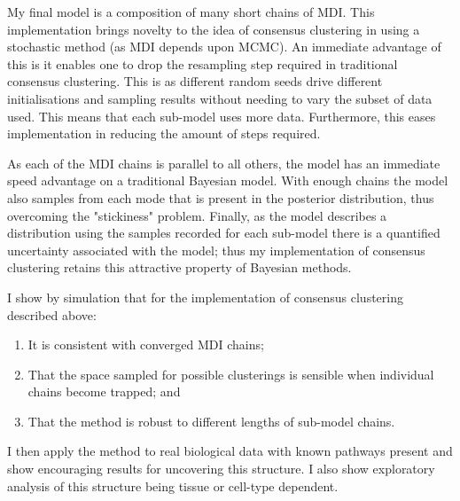 \documentclass[12pt]{article} %
\begin{document}
	My final model is a composition of many short chains of MDI.
	This implementation brings novelty to the idea of consensus clustering in using a stochastic method (as MDI depends upon MCMC). An immediate advantage of this is it enables one to drop the resampling step required in traditional consensus clustering. This is as different random seeds drive different initialisations and sampling results without needing to vary the subset of data used. This means that each sub-model uses more data. Furthermore, this eases implementation in reducing the amount of steps required.
	
	As each of the MDI chains is parallel to all others, the model has an immediate speed advantage on a traditional Bayesian model. With enough chains the model also samples from each mode that is present in the posterior distribution, thus overcoming the "stickiness" problem. Finally, as the model describes a distribution using the samples recorded for each sub-model there is a quantified uncertainty associated with the model; thus my implementation of consensus clustering retains this attractive property of Bayesian methods.
	
	I show by simulation that for the implementation of consensus clustering described above:
	\begin{enumerate}
		\item It is consistent with converged MDI chains;
		\item That the space sampled for possible clusterings is sensible when individual chains become trapped; and
		\item That the method is robust to different lengths of sub-model chains.
	\end{enumerate}
	I then apply the method to real biological data with known pathways present and show encouraging results for uncovering this structure. I also show exploratory analysis of this structure being tissue or cell-type dependent.
	
	
	
	

	
	
	
%	
\end{document}
